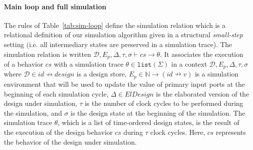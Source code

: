 \documentclass[pdflatex,sn-mathphys]{sn-jnl}%
\theoremstyle{thmstyleone}%
\theoremstyle{thmstyletwo}%
\theoremstyle{thmstylethree}%
\begin{document}

  





\paragraph{Main loop and full simulation}



The rules of Table~\ref{tab:sim-loop} define the \hvhdl{} simulation
relation which is a relational definition of our simulation algorithm
given in a structural \textit{small-step} setting (i.e. all
intermediary states are preserved in a simulation trace).  The
simulation relation is written
$\mathcal{D},E_p,\Delta,\tau,\sigma\vdash{}cs\rightarrow\theta$. It
associates the execution of a behavior $cs$ with a simulation trace
$\theta\in\mathtt{list}(\Sigma)$ in a context
$\mathcal{D},E_p,\Delta,\tau,\sigma$ where
$\mathcal{D}\in{}id\nrightarrow{}design$ is a design store,
$E_p\in\mathbb{N}\rightarrow(id\nrightarrow{}v)$ is a simulation
environment that will be used to update the value of primary input
ports at the beginning of each simulation cycle, $\Delta\in{}ElDesign$
is the elaborated version of the design under simulation, $\tau$ is
the number of clock cycles to be performed during the simulation, and
$\sigma$ is the design state at the beginning of the simulation. The
simulation trace $\theta$, which is a list of time-ordered design
states, is the result of the execution of the design behavior $cs$
during $\tau$ clock cycles. Here, $cs$ represents the behavior of the
\hvhdl{} design under simulation.
\end{document}
